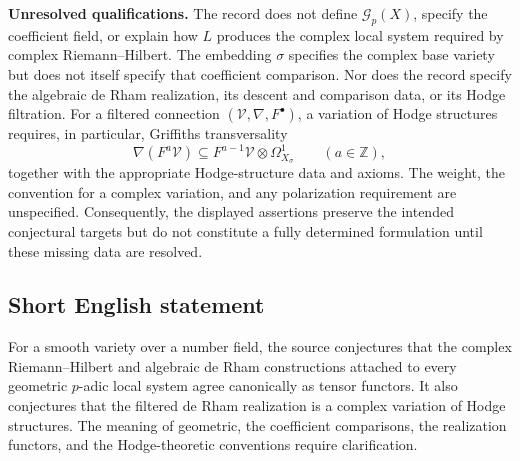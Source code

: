\documentclass[11pt]{article}
\newcommand{\Z}{\mathbb{Z}}
\begin{document}
\textbf{Unresolved qualifications.} The record does not define \(\mathcal G_p(X)\), specify the coefficient field, or explain how \(L\) produces the complex local system required by complex Riemann--Hilbert. The embedding \(\sigma\) specifies the complex base variety but does not itself specify that coefficient comparison. Nor does the record specify the algebraic de Rham realization, its descent and comparison data, or its Hodge filtration. For a filtered connection \((\mathcal V,\nabla,F^\bullet)\), a variation of Hodge structures requires, in particular, Griffiths transversality
\[
\nabla(F^a\mathcal V)\subseteq F^{a-1}\mathcal V\otimes\Omega^1_{X_\sigma}
\qquad(a\in\Z),
\]
together with the appropriate Hodge-structure data and axioms. The weight, the convention for a complex variation, and any polarization requirement are unspecified. Consequently, the displayed assertions preserve the intended conjectural targets but do not constitute a fully determined formulation until these missing data are resolved.
\subsection{Short English statement}
For a smooth variety over a number field, the source conjectures that the complex Riemann--Hilbert and algebraic de Rham constructions attached to every geometric \(p\)-adic local system agree canonically as tensor functors. It also conjectures that the filtered de Rham realization is a complex variation of Hodge structures. The meaning of geometric, the coefficient comparisons, the realization functors, and the Hodge-theoretic conventions require clarification.
\end{document}
